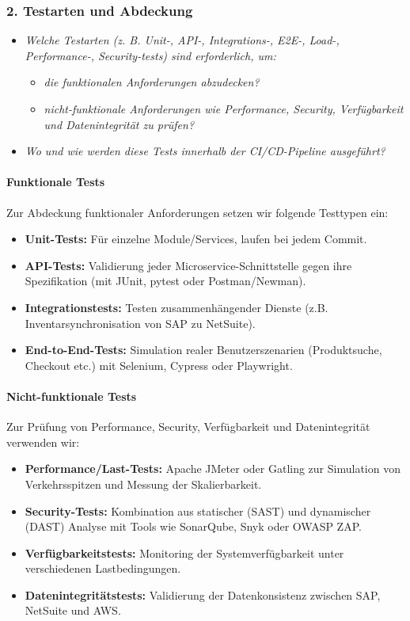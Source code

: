 \subsubsection{2. Testarten und Abdeckung}
\begin{itemize}
    \item \textit{Welche Testarten (z. B. Unit-, API-, Integrations-, E2E-, Load-, Performance-, Security-tests) sind erforderlich, um:}
    \begin{itemize}
        \item \textit{die funktionalen Anforderungen abzudecken?}
        \item \textit{nicht-funktionale Anforderungen wie Performance, Security, Verfügbarkeit und Datenintegrität zu prüfen?}
    \end{itemize}
    \item \textit{Wo und wie werden diese Tests innerhalb der CI/CD-Pipeline ausgeführt?}
\end{itemize}

\paragraph{Funktionale Tests}
Zur Abdeckung funktionaler Anforderungen setzen wir folgende Testtypen ein:
\begin{itemize}
    \item \textbf{Unit-Tests:} Für einzelne Module/Services, laufen bei jedem Commit.
    \item \textbf{API-Tests:} Validierung jeder Microservice-Schnittstelle gegen ihre Spezifikation (mit JUnit, pytest oder Postman/Newman).
    \item \textbf{Integrationstests:} Testen zusammenhängender Dienste (z.B. Inventarsynchronisation von SAP zu NetSuite).
    \item \textbf{End-to-End-Tests:} Simulation realer Benutzerszenarien (Produktsuche, Checkout etc.) mit Selenium, Cypress oder Playwright.
\end{itemize}
\paragraph{Nicht-funktionale Tests}
Zur Prüfung von Performance, Security, Verfügbarkeit und Datenintegrität verwenden wir:
\begin{itemize}
    \item \textbf{Performance/Last-Tests:} Apache JMeter oder Gatling zur Simulation von Verkehrsspitzen und Messung der Skalierbarkeit.
    \item \textbf{Security-Tests:} Kombination aus statischer (SAST) und dynamischer (DAST) Analyse mit Tools wie SonarQube, Snyk oder OWASP ZAP.
    \item \textbf{Verfügbarkeitstests:} Monitoring der Systemverfügbarkeit unter verschiedenen Lastbedingungen.
    \item \textbf{Datenintegritätstests:} Validierung der Datenkonsistenz zwischen SAP, NetSuite und AWS.
\end{itemize}
